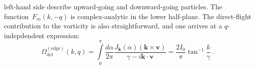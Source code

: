 \documentclass[preprint,aps,eqsecnum, prb]{revtex4-1}
\newcommand{\dct}[1]{{#1}_\mathrm{dct}}
\begin{document}
left-hand side describe upward-going and downward-going particles.
The function~$F_m(k, -q)$ is complex-analytic in the lower half-plane.
The direct-flight contribution to the vorticity is also straightforward,
and one arrives at a  $q$-indepdendent expression:
\begin{equation}
  \label{eq:source-surf-omega-app}
  \dct{\Omega}^{\mathrm{(edge)}}(k, q) =
  \int\limits_{0}^{\pi} \frac{d\alpha}{2\pi} \frac{J_{\bm k}(\alpha)
        ({\bm k} \times {\bm v})}{\gamma - i {\bm k} \cdot {\bm v}}
    = \frac{2 I_0}{\pi} \tan^{-1} \frac{k}{\gamma}\ .
\end{equation}
\end{document}
